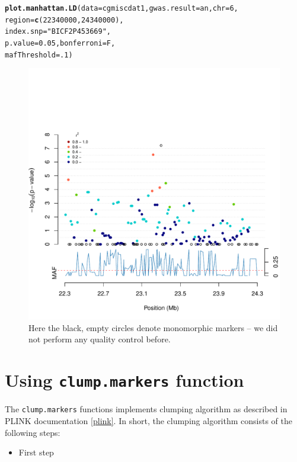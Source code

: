 \documentclass{article}\usepackage{graphicx, color}
\makeatletter
\newcommand{\hlfunctioncall}[1]{\textcolor[rgb]{0.501960784313725,0,0.329411764705882}{\textbf{#1}}}%
\newcommand{\hlstring}[1]{\textcolor[rgb]{0.6,0.6,1}{#1}}%
\newenvironment{kframe}{%
 \def\at@end@of@kframe{}%
 \ifinner\ifhmode%
  \def\at@end@of@kframe{\end{minipage}}%
  \begin{minipage}{\columnwidth}%
 \fi\fi%
 \def\FrameCommand##1{\hskip\@totalleftmargin \hskip-\fboxsep
 \colorbox{shadecolor}{##1}\hskip-\fboxsep
     \hskip-\linewidth \hskip-\@totalleftmargin \hskip\columnwidth}%
 \MakeFramed {\advance\hsize-\width
   \@totalleftmargin\z@ \linewidth\hsize
   \@setminipage}}%
 {\par\unskip\endMakeFramed%
 \at@end@of@kframe}
\newenvironment{knitrout}{}{} %
\makeatother
\begin{document}
\begin{knitrout}
\color{fgcolor}\begin{kframe}
\begin{alltt}
\hlfunctioncall{plot.manhattan.LD}(data=cgmiscdat1, gwas.result=an, chr=6, 
                  region=\hlfunctioncall{c}(22340000, 24340000), 
                  index.snp=\hlstring{"BICF2P453669"}, 
                  p.value=0.05, bonferroni=F, 
                  mafThreshold=.1)
\end{alltt}
\end{kframe}\begin{figure}[]


{\centering \includegraphics[width=1.0\textwidth]{figure/plot_Manhattan_LD_3} 

}

\caption[Here the black, empty circles denote monomorphic markers -- we did not perform any quality control before]{Here the black, empty circles denote monomorphic markers -- we did not perform any quality control before.\label{fig:plot.Manhattan.LD.3}}
\end{figure}


\end{knitrout}

\section{Using {\tt clump.markers} function}
The {\tt clump.markers} functions implements clumping algorithm as described in PLINK documentation \ref{plink}. In short, the clumping algorithm consists of the following steps:
\begin{itemize}
\item{First step}
\end{itemize}
\end{document}
